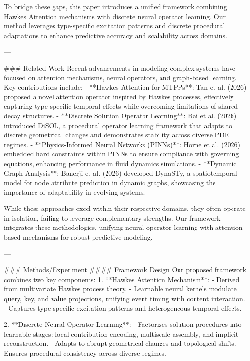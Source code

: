 To bridge these gaps, this paper introduces a unified framework combining Hawkes Attention mechanisms with discrete neural operator learning. Our method leverages type-specific excitation patterns and discrete procedural adaptations to enhance predictive accuracy and scalability across domains.

---

### Related Work
Recent advancements in modeling complex systems have focused on attention mechanisms, neural operators, and graph-based learning. Key contributions include:
- **Hawkes Attention for MTPPs**: Tan et al. (2026) proposed a novel attention operator inspired by Hawkes processes, effectively capturing type-specific temporal effects while overcoming limitations of shared decay structures.
- **Discrete Solution Operator Learning**: Bai et al. (2026) introduced DiSOL, a procedural operator learning framework that adapts to discrete geometrical changes and demonstrates stability across diverse PDE regimes.
- **Physics-Informed Neural Networks (PINNs)**: Horne et al. (2026) embedded hard constraints within PINNs to ensure compliance with governing equations, enhancing performance in fluid dynamics simulations.
- **Dynamic Graph Analysis**: Banerji et al. (2026) developed DynaSTy, a spatiotemporal model for node attribute prediction in dynamic graphs, showcasing the importance of adaptability in evolving systems.

While these approaches excel within their respective domains, they often operate in isolation, failing to leverage complementary strengths. Our framework integrates these methodologies, unifying neural operator learning with attention-based mechanisms for robust predictive modeling.

---

### Methods/Experiment
#### Framework Design
Our proposed framework combines two key components:
1. **Hawkes Attention Mechanism**:
   - Derived from multivariate Hawkes process theory.
   - Learnable neural kernels modulate query, key, and value projections, unifying event timing with content interaction.
   - Captures type-specific excitation patterns and heterogeneous temporal effects.

2. **Discrete Neural Operator Learning**:
   - Factorizes solution procedures into learnable stages: local contribution encoding, multiscale assembly, and implicit reconstruction.
   - Adapts to abrupt geometrical changes and topological shifts.
   - Ensures procedural consistency across diverse regimes.

